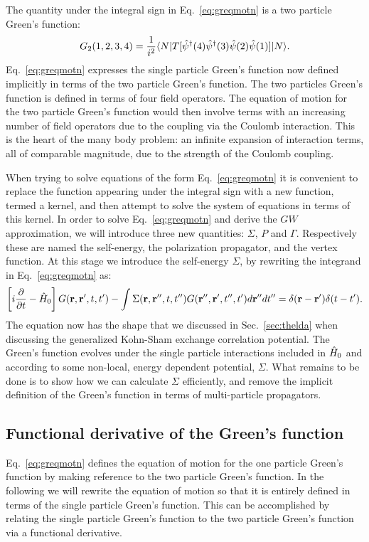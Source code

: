 The quantity under the integral sign in Eq.~\ref{eq:greqmotn} is a two particle Green's function:
%
\begin{equation}
\label{eq:2pgreenfxn}
G_{2}(1,2,3,4) = \frac{1}{i^{2}} \langle N|T[\hat{\psi}^{\dagger}(4)\hat{\psi}^{\dagger}(3)\hat{\psi}(2)\hat{\psi}(1)]|N\rangle.
\end{equation}
%
Eq.~\ref{eq:greqmotn} expresses the single particle Green's function now defined 
implicitly in terms of the two particle Green's function. The two particles Green's function is 
defined in terms of  four field operators. The equation of motion for the two particle Green's 
function would then involve terms with an increasing number of field operators due to the coupling 
via the Coulomb interaction.
This is the heart of the many body problem: an infinite expansion of interaction terms,
all of comparable magnitude, due to the strength of the Coulomb coupling.

When trying to solve equations of the form Eq.~\ref{eq:greqmotn} it is convenient to 
replace the function appearing under the integral sign with a new function,
termed a kernel, and then attempt to solve the system of equations in terms of this kernel.
In order to solve Eq.~\ref{eq:greqmotn} and derive the $GW$ approximation,
we will introduce three new quantities: $\Sigma$, $P$ and $\Gamma$.
Respectively these are named the self-energy, the polarization propagator, and the vertex function.
At this stage we introduce the self-energy $\Sigma$, by rewriting the integrand in Eq.~\ref{eq:greqmotn} as:
%
\begin{equation}
\label{eq:greqmsig}
\left[i\frac{\partial}{\partial t} - \hat{H}_{0}\right]G({\bf r},{\bf r}',t,t') - \int \Sigma({\bf r},{\bf r}'',t,t'')G({\bf r}'',{\bf r^\prime},t'',t')d{\bf r}''dt'' =  \delta({\bf r}-{\bf r^\prime})\delta(t-t').
\end{equation}
%
The equation now has the shape that we discussed in Sec.~\ref{sec:thelda} when discussing
the generalized Kohn-Sham exchange correlation potential. The Green's 
function evolves under the single particle
interactions included in $\hat{H}_{0}$ and according to some non-local, energy dependent potential, $\Sigma$.
What remains to be done is to show how we can calculate $\Sigma$ efficiently, and remove the 
implicit definition of the Green's function in terms of multi-particle propagators.

\subsection{Functional derivative of the Green's function}
\noindent
Eq.~\ref{eq:greqmotn} defines the equation of motion for the one particle Green's
function by making reference to the two particle Green's function.
In the following we will rewrite the equation of motion so that it is entirely defined in
terms of the single particle Green's function. This can be
accomplished by relating the single particle Green's function to the two particle Green's
function via a functional derivative.

